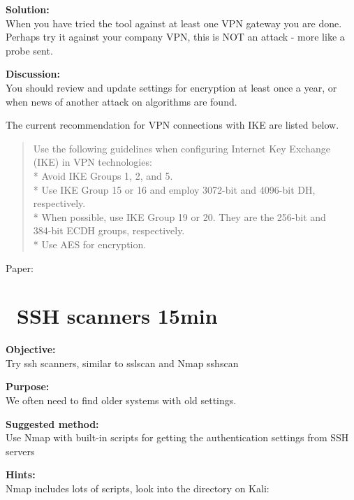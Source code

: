 \documentclass[a4paper,11pt,notitlepage]{report}
\begin{document}
{\bf Solution:}\\
When you have tried the tool against at least one VPN gateway you are done. Perhaps try it against your company VPN, this is NOT an attack - more like a probe sent.

{\bf Discussion:}\\
You should review and update settings for encryption at least once a year, or when news of another attack on algorithms are found.

The current recommendation for VPN connections with IKE are listed below.

\begin{quote}
  Use the following guidelines when configuring Internet Key Exchange (IKE) in VPN technologies:\\
* Avoid IKE Groups 1, 2, and 5.\\
* Use IKE Group 15 or 16 and employ 3072-bit and 4096-bit DH, respectively.\\
* When possible, use IKE Group 19 or 20. They are the 256-bit and \\
384-bit ECDH groups, respectively.\\
* Use AES for encryption.
\end{quote}
Paper:\\
{\small {}}



\chapter{\faInfoCircle\ SSH scanners 15min}
\label{ex:nmap-ssh-scanner}


{\bf Objective:}\\
Try ssh scanners, similar to sslscan and Nmap sshscan

{\bf Purpose:}\\
We often need to find older systems with old settings.

{\bf Suggested method:}\\
Use Nmap with built-in scripts for getting the authentication settings from SSH servers

{\bf Hints:}\\
Nmap includes lots of scripts, look into the directory on Kali:
\end{document}

